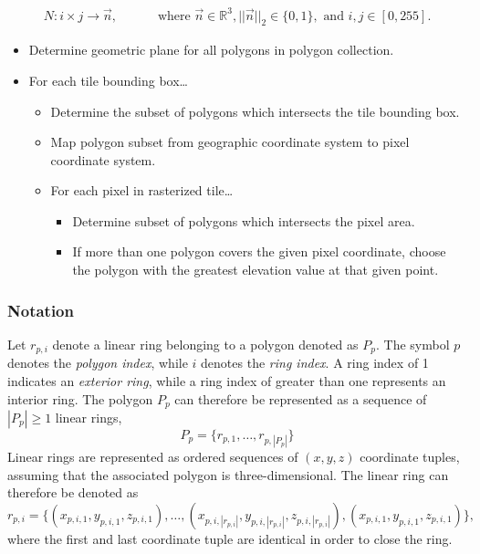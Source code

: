 \begin{align*}
  N: i \times j \rightarrow \vec{n},
  \hspace{2em} & \text{ where } \vec{n} \in \mathbb{R}^3, ||\vec{n}||_2 \in \{0, 1\},
  \text{ and } i, j \in [0, 255].
\end{align*}


\begin{leftbar}
  \begin{itemize}[nosep,leftmargin=*]
    \item Determine geometric plane for all polygons in polygon collection.
    \item For each tile bounding box\ldots
    \begin{itemize}[nosep,leftmargin=0.5cm]
      \item Determine the subset of polygons which intersects the tile bounding box.
      \item Map polygon subset from geographic coordinate system to pixel coordinate system.
      \item For each pixel in rasterized tile\ldots
      \begin{itemize}[nosep,leftmargin=0.5cm]
        \item Determine subset of polygons which intersects the pixel area.
        \item If more than one polygon covers the given pixel coordinate, choose the polygon with the greatest elevation value at that given point.
      \end{itemize}
    \end{itemize}
  \end{itemize}
\end{leftbar}

\subsubsection{Notation}

Let $r_{p,i}$ denote a linear ring belonging to a polygon denoted as $P_p$.
The symbol $p$ denotes the \textit{polygon index}, while $i$ denotes the \textit{ring index}.
A ring index of 1 indicates an \textit{exterior ring}, while a ring index of greater than one represents an interior ring.
The polygon $P_p$ can therefore be represented as a sequence of $|P_p| \geq 1$ linear rings,
%
\begin{equation*}
P_p = \{ r_{p,1}, \dots, r_{p, |P_p|}\}
\end{equation*}
%
Linear rings are represented as ordered sequences of $(x, y, z)$ coordinate tuples, assuming that the associated polygon is three-dimensional.
The linear ring can therefore be denoted as
%
\begin{equation*}
  r_{p,i}
  =
  \{
    (x_{p,i,1}, y_{p,i,1}, z_{p,i,1}),
    \dots,
    (x_{p,i,|r_{p, i}|}, y_{p,i,|r_{p, i}|}, z_{p,i,|r_{p, i}|}),
    (x_{p,i,1}, y_{p,i,1}, z_{p,i,1})
  \},
\end{equation*}
%
where the first and last coordinate tuple are identical in order to close the ring.

